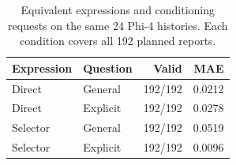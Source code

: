 \begin{table}[t]
\centering
\begin{tabular}{llrr}
\toprule
Expression & Question & Valid & MAE \\
\midrule
Direct & General & 192/192 & 0.0212 \\
Direct & Explicit & 192/192 & 0.0278 \\
Selector & General & 192/192 & 0.0519 \\
Selector & Explicit & 192/192 & 0.0096 \\
\bottomrule
\end{tabular}
\caption{Equivalent expressions and conditioning requests on the same 24 Phi-4 histories. Each condition covers all 192 planned reports.}
\label{tab:followup-expression}
\end{table}
